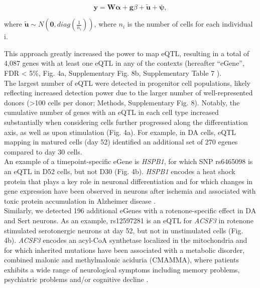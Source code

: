 \begin{equation}
    \mathbf{y} = \mathbf{W}\boldsymbol{\alpha} + \mathbf{g}\beta + \tilde{\mathbf{u}} + \boldsymbol{\psi}, 
\end{equation}

where $\tilde{\mathbf{u}} \sim N(\mathbf{0}, diag(\frac{1}{n_i}))$, where $n_i$ is the number of cells for each individual i.

This approach greatly increased the power to map eQTL, resulting in a total of 4,087 genes with at least one eQTL in any of the contexts (hereafter “eGene”, FDR < 5\%, Fig. 4a, Supplementary Fig. 8b, Supplementary Table 7 ).\\

The largest number of eQTL were detected in progenitor cell populations, likely reflecting increased detection power due to the larger number of well-represented donors (>100 cells per donor; Methods, Supplementary Fig. 8). 
Notably, the cumulative number of genes with an eQTL in each cell type increased substantially when considering cells further progressed along the differentiation axis, as well as upon stimulation (Fig. 4a). 
For example, in DA cells, eQTL mapping in matured cells (day 52) identified an additional set of 270 egenes compared to day 30 cells.\\

An example of a timepoint-specific eGene is \textit{HSPB1}, for which SNP rs6465098 is an eQTL in D52 cells, but not D30 (Fig. 4b). 
\textit{HSPB1} encodes a heat shock protein that plays a key role in neuronal differentiation \cite{miller2018heat} and for which changes in gene expression have been observed in neurons after ischemia \cite{bartelt2016hspb5} and associated with toxic protein accumulation in Alzheimer disease \cite{shimura2004binding, wilhelmus2006small}.\\

Similarly, we detected 196 additional eGenes with a rotenone-specific effect in DA and Sert neurons. 
As an example, rs12597281 is an eQTL for \textit{ACSF3} in rotenone stimulated serotonergic neurons at day 52, but not in unstimulated cells (Fig. 4b). 
\textit{ACSF3} encodes an acyl-CoA synthetase localized in the mitochondria and for which inherited mutations have been associated with a metabolic disorder, combined malonic and methylmalonic aciduria (CMAMMA), where patients exhibits a wide range of neurological symptoms including memory problems, psychiatric problems and/or cognitive decline \cite{tucci2020brain}.\\

